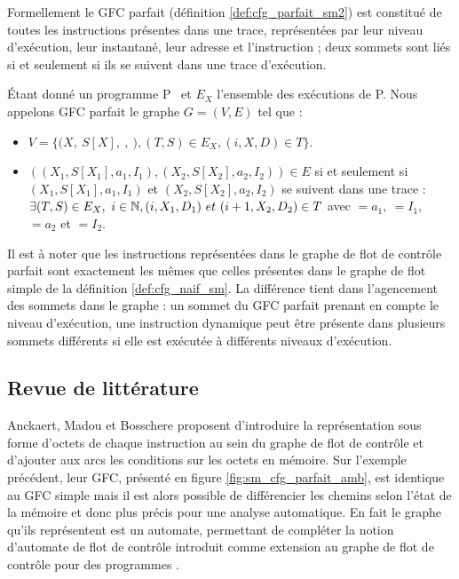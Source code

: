 Formellement le GFC parfait (définition \ref{def:cfg_parfait_sm2}) est constitué de toutes les instructions présentes dans une trace, représentées par leur niveau d'exécution, leur instantané, leur adresse et l'instruction ; deux sommets sont liés si et seulement si ils se suivent dans une trace d'exécution.

\begin{defi}
 Étant donné un programme P \sm\ et $E_X$ l'ensemble des exécutions de P.
 Nous appelons GFC parfait le graphe $G=(V, E)$ tel que :
 \begin{itemize}
  \item $V=\{(X,\ S[X],\ $$,\ $$), (T, S)\in E_X, (i, X, D)\in T\}$.%
  \item $((X_1, S[X_1], a_1, I_1), (X_2, S[X_2], a_2, I_2))\in E$ si et seulement si $(X_1, S[X_1], a_1,
I_1)$ et $(X_2, S[X_2], a_2, I_2)$ se suivent dans une trace : $\exists (T, S)\in
E_X,\ i\in \mathbb N, (i, X_1, D_1)\ et\ (i+1, X_2, D_2)\in T$ avec $=a_1,\ $$=I_1,$~$=a_2$ et $=I_2$.
 \end{itemize}
\label{def:cfg_parfait_sm2}
\end{defi}

Il est à noter que les instructions représentées dans le graphe de flot de contrôle parfait sont exactement les mêmes que celles présentes dans le graphe de flot simple de la définition \ref{def:cfg_naif_sm}.
La différence tient dans l'agencement des sommets dans le graphe : un sommet du GFC parfait prenant en compte le niveau d'exécution, une instruction dynamique peut être présente dans plusieurs sommets différents si elle est exécutée à différents niveaux d'exécution.

\FloatBarrier
\subsection{Revue de littérature}
Anckaert, Madou et Bosschere \cite{AMB06} proposent d'introduire la représentation sous forme d'octets de chaque instruction au sein du graphe de flot de contrôle et d'ajouter aux arcs les conditions sur les octets en mémoire. Sur l'exemple précédent, leur GFC, présenté en figure \ref{fig:sm_cfg_parfait_amb}, est identique au GFC simple mais il est alors possible de différencier les chemins selon l'état de la mémoire et donc plus précis pour une analyse automatique.
En fait le graphe qu'ils représentent est un automate, permettant de compléter la notion d'automate de flot de contrôle introduit comme extension au graphe de flot de contrôle \cite{HJMS02} pour des programmes \sms.

